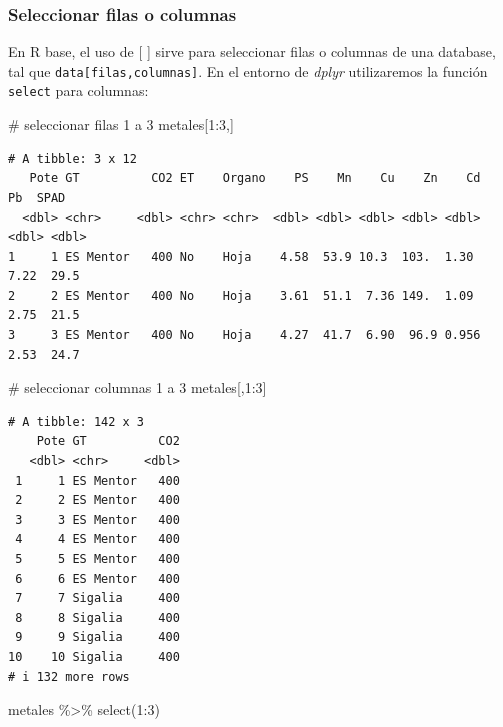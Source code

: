 \documentclass[
  letterpaper,
  DIV=11,
  numbers=noendperiod]{scrartcl}
\newenvironment{Shaded}{\begin{snugshade}}{\end{snugshade}}
\newcommand{\CommentTok}[1]{\textcolor[rgb]{0.37,0.37,0.37}{#1}}
\newcommand{\DecValTok}[1]{\textcolor[rgb]{0.68,0.00,0.00}{#1}}
\newcommand{\FunctionTok}[1]{\textcolor[rgb]{0.28,0.35,0.67}{#1}}
\newcommand{\NormalTok}[1]{\textcolor[rgb]{0.00,0.23,0.31}{#1}}
\newcommand{\SpecialCharTok}[1]{\textcolor[rgb]{0.37,0.37,0.37}{#1}}
\begin{document}
\hypertarget{seleccionar-filas-o-columnas}{%
\subsubsection{Seleccionar filas o
columnas}\label{seleccionar-filas-o-columnas}}

En R base, el uso de {[} {]} sirve para seleccionar filas o columnas de
una database, tal que \texttt{data{[}filas,columnas{]}}. En el entorno
de \emph{dplyr} utilizaremos la función \texttt{select} para columnas:

\begin{Shaded}
\begin{Highlighting}[]
\CommentTok{\# seleccionar filas 1 a 3}
\NormalTok{metales[}\DecValTok{1}\SpecialCharTok{:}\DecValTok{3}\NormalTok{,]}
\end{Highlighting}
\end{Shaded}

\begin{verbatim}
# A tibble: 3 x 12
   Pote GT          CO2 ET    Organo    PS    Mn    Cu    Zn    Cd    Pb  SPAD
  <dbl> <chr>     <dbl> <chr> <chr>  <dbl> <dbl> <dbl> <dbl> <dbl> <dbl> <dbl>
1     1 ES Mentor   400 No    Hoja    4.58  53.9 10.3  103.  1.30   7.22  29.5
2     2 ES Mentor   400 No    Hoja    3.61  51.1  7.36 149.  1.09   2.75  21.5
3     3 ES Mentor   400 No    Hoja    4.27  41.7  6.90  96.9 0.956  2.53  24.7
\end{verbatim}

\begin{Shaded}
\begin{Highlighting}[]
\CommentTok{\# seleccionar columnas 1 a 3}
\NormalTok{metales[,}\DecValTok{1}\SpecialCharTok{:}\DecValTok{3}\NormalTok{]}
\end{Highlighting}
\end{Shaded}

\begin{verbatim}
# A tibble: 142 x 3
    Pote GT          CO2
   <dbl> <chr>     <dbl>
 1     1 ES Mentor   400
 2     2 ES Mentor   400
 3     3 ES Mentor   400
 4     4 ES Mentor   400
 5     5 ES Mentor   400
 6     6 ES Mentor   400
 7     7 Sigalia     400
 8     8 Sigalia     400
 9     9 Sigalia     400
10    10 Sigalia     400
# i 132 more rows
\end{verbatim}

\begin{Shaded}
\begin{Highlighting}[]
\NormalTok{metales }\SpecialCharTok{\%\textgreater{}\%} \FunctionTok{select}\NormalTok{(}\DecValTok{1}\SpecialCharTok{:}\DecValTok{3}\NormalTok{)}
\end{Highlighting}
\end{Shaded}
\end{document}
